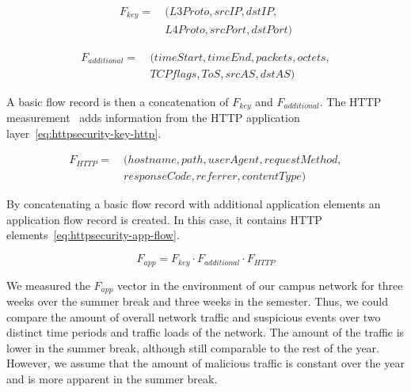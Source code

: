 \begin{equation} \label{eq:httpsecurity-flow-key}
    \begin{split}
        F_{key} =\ &(L3Proto, srcIP, dstIP, \\
        & L4Proto, srcPort, dstPort)
    \end{split}
\end{equation}

\begin{equation} \label{eq:httpsecurity-flow-additional}
    \begin{split}
        F_{additional} =\ &(timeStart, timeEnd, packets, octets, \\
        & TCPflags, ToS, srcAS, dstAS )
    \end{split}
\end{equation}

A basic flow record is then a concatenation of $F_{key}$ and $F_{additional}$. The HTTP measurement~\cite{Velan-2013-Design} adds information from the HTTP application layer~\eqref{eq:httpsecurity-key-http}. 

\begin{equation} \label{eq:httpsecurity-key-http}
    \begin{split}
        F_{HTTP} =\ &(hostname, path, userAgent, requestMethod, \\
        & responseCode, referrer, contentType )
    \end{split}
\end{equation}

By concatenating a basic flow record with additional application elements an application flow record is created. In this case, it contains HTTP elements~\eqref{eq:httpsecurity-app-flow}.

\begin{equation} \label{eq:httpsecurity-app-flow}
        F_{app} = F_{key} \cdot F_{additional} \cdot F_{HTTP}
\end{equation}

We measured the $F_{app}$ vector in the environment of our campus network for three weeks over the summer break and three weeks in the semester. Thus, we could compare the amount of overall network traffic and suspicious events over two distinct time periods and traffic loads of the network. The amount of the traffic is lower in the summer break, although still comparable to the rest of the year. However, we assume that the amount of malicious traffic is constant over the year and is more apparent in the summer break.

